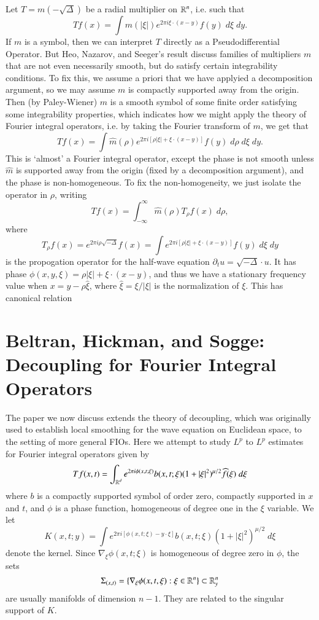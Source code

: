 Let $T = m(-\sqrt{\Delta})$ be a radial multiplier on $\operatorname{\mathbb{R}}^n$, i.e. such that
%
\[ T f(x) = \int m(|\xi|) e^{2 \pi i \xi \cdot (x - y)} f(y)\; d\xi\; dy. \]
%
If $m$ is a symbol, then we can interpret $T$ directly as a Pseudodifferential Operator. But Heo, Nazarov, and Seeger's result discuss families of multipliers $m$ that are not even necessarily smooth, but do satisfy certain integrability conditions. To fix this, we assume a priori that we have applyied a decomposition argument, so we may assume $m$ is compactly supported away from the origin. Then (by Paley-Wiener) $\widehat{m}$ is a smooth symbol of some finite order satisfying some integrability properties, which indicates how we might apply the theory of Fourier integral operators, i.e. by taking the Fourier transform of $m$, we get that
%
\[ Tf(x) = \int \widehat{m}(\rho) e^{2 \pi i [\rho |\xi| + \xi \cdot (x-y)]} f(y)\; d\rho\; d\xi\; dy. \]
%
This is `almost' a Fourier integral operator, except the phase is not smooth unless $\widehat{m}$ is supported away from the origin (fixed by a decomposition argument), and the phase is non-homogeneous. To fix the non-homogeneity, we just isolate the operator in $\rho$, writing
%
\[ Tf(x) = \int_{-\infty}^\infty \widehat{m}(\rho) T_\rho f(x)\; d\rho, \]
%
where
%
\[ T_\rho f(x) = e^{2 \pi i \rho \sqrt{-\Delta}} f(x) = \int e^{2 \pi i [\rho |\xi| + \xi \cdot (x - y)]} f(y)\; d\xi\; dy \]
%
is the propogation operator for the half-wave equation $\partial_t u = \sqrt{-\Delta} \cdot u$. It has phase $\phi(x,y,\xi) = \rho |\xi| + \xi \cdot (x - y)$, and thus we have a stationary frequency value when $x = y - \rho \widehat{\xi}$, where $\widehat{\xi} = \xi / |\xi|$ is the normalization of $\xi$. This has canonical relation











\chapter{Beltran, Hickman, and Sogge: Decoupling for Fourier Integral Operators}

The paper we now discuss extends the theory of decoupling, which was originally used to establish local smoothing for the wave equation on Euclidean space, to the setting of more general FIOs. Here we attempt to study $L^p$ to $L^p$ estimates  for Fourier integral operators given by
%
\[ Tf(x,t) = \int_{\operatorname{\mathbb{R}}^d} e^{2 \pi i \phi(x,t;\xi)} b(x,t;\xi) (1 + |\xi|^2)^{\mu/2} \widehat{f}(\xi)\; d\xi \]
%
where $b$ is a compactly supported symbol of order zero, compactly supported in $x$ and $t$, and $\phi$ is a phase function, homogeneous of degree one in the $\xi$ variable. We let
%
\[ K(x,t;y) = \int e^{2 \pi i [\phi(x,t;\xi) - y \cdot \xi]} b(x,t;\xi) (1 + |\xi|^2)^{\mu/2}\; d\xi \]
%
denote the kernel. Since $\nabla_\xi \phi(x,t;\xi)$ is homogeneous of degree zero in $\phi$, the sets
%
\[ \Sigma_{(x,t)} = \{ \nabla_\xi \phi(x,t,\xi) : \xi \in \operatorname{\mathbb{R}}^n \} \subset \operatorname{\mathbb{R}}^n_y \]
%
are usually manifolds of dimension $n-1$. They are related to the singular support of $K$.

